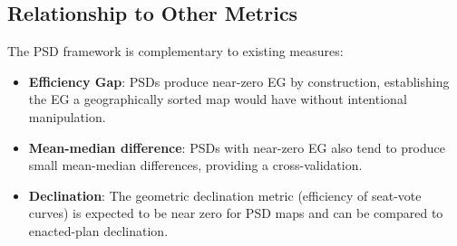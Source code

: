 \subsection{Relationship to Other Metrics}

The PSD framework is complementary to existing measures:

\begin{itemize}
  \item \textbf{Efficiency Gap}: PSDs produce near-zero EG by construction,
    establishing the EG a geographically sorted map would have without
    intentional manipulation.
  \item \textbf{Mean-median difference}: PSDs with near-zero EG also tend to
    produce small mean-median differences, providing a cross-validation.
  \item \textbf{Declination}: The geometric declination metric (efficiency
    of seat-vote curves) is expected to be near zero for PSD maps and can
    be compared to enacted-plan declination.
\end{itemize}
